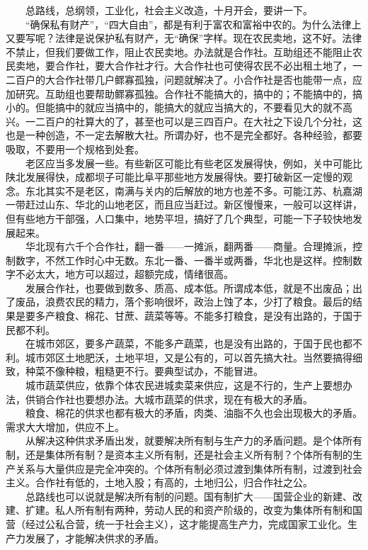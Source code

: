 \documentclass[cn,11pt,chinese]{elegantbook}
\begin{document}
　　总路线，总纲领，工业化，社会主义改造，十月开会，要讲一下。\\
　　“确保私有财产”，“四大自由”，都是有利于富农和富裕中农的。为什么法律上又要写呢？法律是说保护私有财产，无“确保”字样。现在农民卖地，这不好。法律不禁止，但我们要做工作，阻止农民卖地。办法就是合作社。互助组还不能阻止农民卖地，要合作社，要大合作社才行。大合作社也可使得农民不必出租土地了，一二百户的大合作社带几户鳏寡孤独，问题就解决了。小合作社是否也能带一点，应加研究。互助组也要帮助鳏寡孤独。合作社不能搞大的，搞中的；不能搞中的，搞小的。但能搞中的就应当搞中的，能搞大的就应当搞大的，不要看见大的就不高兴。一二百户的社算大的了，甚至也可以是三四百户。在大社之下设几个分社，这也是一种创造，不一定去解散大社。所谓办好，也不是完全都好。各种经验，都要吸取，不要用一个规格到处套。\\
　　老区应当多发展一些。有些新区可能比有些老区发展得快，例如，关中可能比陕北发展得快，成都坝子可能比阜平那些地方发展得快。要打破新区一定慢的观念。东北其实不是老区，南满与关内的后解放的地方也差不多。可能江苏、杭嘉湖一带赶过山东、华北的山地老区，而且应当赶过。新区慢慢来，一般可以这样讲，但有些地方干部强，人口集中，地势平坦，搞好了几个典型，可能一下子较快地发展起来。\\
　　华北现有六千个合作社，翻一番——一摊派，翻两番——商量。合理摊派，控制数字，不然工作时心中无数。东北一番、一番半或两番，华北也是这样。控制数字不必太大，地方可以超过，超额完成，情绪很高。\\
　　发展合作社，也要做到数多、质高、成本低。所谓成本低，就是不出废品；出了废品，浪费农民的精力，落个影响很坏，政治上蚀了本，少打了粮食。最后的结果是要多产粮食、棉花、甘蔗、蔬菜等等。不能多打粮食，是没有出路的，于国于民都不利。\\
　　在城市郊区，要多产蔬菜，不能多产蔬菜，也是没有出路的，于国于民也都不利。城市郊区土地肥沃，土地平坦，又是公有的，可以首先搞大社。当然要搞得细致，种菜不像种粮，粗糙更不行。要典型试办，不能冒进。\\
　　城市蔬菜供应，依靠个体农民进城卖菜来供应，这是不行的，生产上要想办法，供销合作社也要想办法。大城市蔬菜的供求，现在有极大的矛盾。\\
　　粮食、棉花的供求也都有极大的矛盾，肉类、油脂不久也会出现极大的矛盾。需求大大增加，供应不上。\\
　　从解决这种供求矛盾出发，就要解决所有制与生产力的矛盾问题。是个体所有制，还是集体所有制？是资本主义所有制，还是社会主义所有制？个体所有制的生产关系与大量供应是完全冲突的。个体所有制必须过渡到集体所有制，过渡到社会主义。合作社有低的，土地入股；有高的，土地归公，归合作社之公。\\
　　总路线也可以说就是解决所有制的问题。国有制扩大——国营企业的新建、改建、扩建。私人所有制有两种，劳动人民的和资产阶级的，改变为集体所有制和国营（经过公私合营，统一于社会主义），这才能提高生产力，完成国家工业化。生产力发展了，才能解决供求的矛盾。\\
\end{document}
